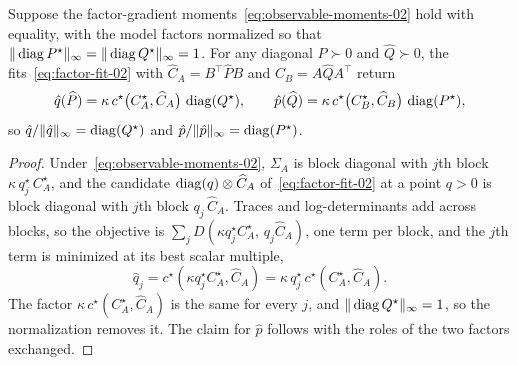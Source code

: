 \begin{lemma}[Consistency]\label{lem:consistency-02}
Suppose the factor-gradient moments~\eqref{eq:observable-moments-02} hold with
equality, with the model factors normalized so that
$\| \operatorname{diag} P^\star\|_\infty=\| \operatorname{diag} Q^\star\|_\infty=1$. For any diagonal
$\widehat P\succ0$ and $\widehat Q\succ0$, the
fits~\eqref{eq:factor-fit-02} with $\widehat C_A=B^\top\widehat PB$ and
$\widehat C_B=A\widehat QA^\top$ return
\[
  \hat{q}(\widehat P)=\kappa\,c^\star\big(C^\star_A,\widehat C_A\big)\,\operatorname{diag}(Q^\star),
  \qquad
  \hat{p}(\widehat Q)=\kappa\,c^\star\big(C^\star_B,\widehat C_B\big)\,\operatorname{diag}(P^\star),
\]
so $\hat{q}/\| \hat{q}\|_\infty=\operatorname{diag}(Q^\star)$ and
$\hat{p}/\| \hat{p}\|_\infty=\operatorname{diag}(P^\star)$.
\end{lemma}
\begin{proof}
Under~\eqref{eq:observable-moments-02}, $\Sigma_A$ is
block diagonal with $j$th block $\kappa\,q^\star_j\,C^\star_A$, and the
candidate $\operatorname{diag}(q)\otimes\widehat C_A$ of~\eqref{eq:factor-fit-02} at a
point $q>0$ is block diagonal with $j$th block $q_j\,\widehat C_A$. Traces
and log-determinants add across blocks, so the objective is
$\sum_jD(\kappa q^\star_jC^\star_A,\,q_j\widehat C_A)$, one term per block,
and the $j$th term is minimized at its best scalar multiple,
\[
\hat{q}_j=c^\star(\kappa q^\star_jC^\star_A,\widehat C_A)
=\kappa\,q^\star_j\,c^\star(C^\star_A,\widehat C_A).
\]
The factor $\kappa\,c^\star(C^\star_A,\widehat C_A)$ is the same for every
$j$, and $\| \operatorname{diag} Q^\star\|_\infty=1$, so the normalization removes it.
The claim for $\hat{p}$ follows with the roles of the two factors exchanged.
\end{proof}

